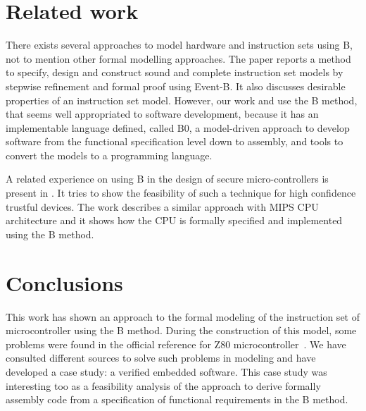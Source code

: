 \documentclass[a4paper]{llncs}
\begin{document}
\section{Related work}
\label{sec:relatedworks}

There exists several approaches to model hardware and instruction sets
using B, not to mention other formal modelling approaches.  The paper
\cite{springerlink:Yuan2011} reports a method to specify, design and
construct sound and complete instruction set models by stepwise
refinement and formal proof using Event-B. It also discusses desirable
properties of an instruction set model. However, our work
\cite{Valerio_SBMF09} and \cite{Subotic2010} use the B method, that
seems well appropriated to software development, because it has an
implementable language defined, called B0, a model-driven approach
\cite{Dantas_SBMF08} to develop software from the functional
specification level down to assembly, and tools to convert the models
to a programming language.

A related experience on using B in the design of secure
micro-controllers is present in \cite{Marc20113}. It tries to show the
feasibility of such a technique for high confidence trustful
devices. The work \cite{Subotic2010} describes a similar approach with
MIPS CPU architecture and it shows how the CPU is formally specified
and implemented using the B method.




 
\section{Conclusions}
\label{sec:conclusions} 

This work has shown an approach to the formal modeling of the
instruction set of microcontroller using the B method.  During the
construction of this model, some problems were found in the official
reference for Z80 microcontroller~\cite{Z80_manual}. We have consulted
different sources \cite{Simulator_z80,UndocumentedZ80,Z80_manual} to
solve such problems in modeling and have developed a case study: a
verified embedded software.  This case study was interesting too as a
feasibility analysis of the approach to derive formally assembly code
from a specification of functional requirements in the B method.

\end{document}

